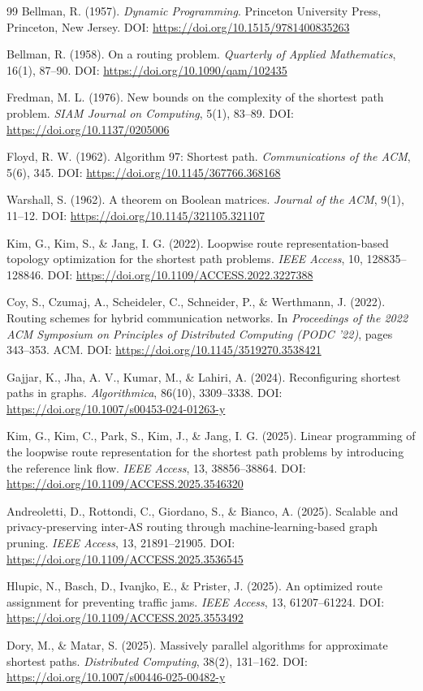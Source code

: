 \documentclass[10pt]{NSP1}
\begin{document}
	\begin{thebibliography}{99}
	Bellman, R. (1957). \emph{Dynamic Programming}. Princeton University Press, Princeton, New Jersey. DOI: \url{https://doi.org/10.1515/9781400835263}
	
	Bellman, R. (1958). On a routing problem. \emph{Quarterly of Applied Mathematics}, 16(1), 87--90. DOI: \url{https://doi.org/10.1090/qam/102435}
	
	Fredman, M. L. (1976). New bounds on the complexity of the shortest path problem. \emph{SIAM Journal on Computing}, 5(1), 83--89. DOI: \url{https://doi.org/10.1137/0205006}
	
	Floyd, R. W. (1962). Algorithm 97: Shortest path. \emph{Communications of the ACM}, 5(6), 345. DOI: \url{https://doi.org/10.1145/367766.368168}
	
	Warshall, S. (1962). A theorem on Boolean matrices. \emph{Journal of the ACM}, 9(1), 11--12. DOI: \url{https://doi.org/10.1145/321105.321107}
	
	Kim, G., Kim, S., \& Jang, I. G. (2022). Loopwise route representation-based topology optimization for the shortest path problems. \emph{IEEE Access}, 10, 128835--128846. DOI: \url{https://doi.org/10.1109/ACCESS.2022.3227388}
	
	Coy, S., Czumaj, A., Scheideler, C., Schneider, P., \& Werthmann, J. (2022). Routing schemes for hybrid communication networks. In \emph{Proceedings of the 2022 ACM Symposium on Principles of Distributed Computing (PODC '22)}, pages 343--353. ACM. DOI: \url{https://doi.org/10.1145/3519270.3538421}
	
	Gajjar, K., Jha, A. V., Kumar, M., \& Lahiri, A. (2024). Reconfiguring shortest paths in graphs. \emph{Algorithmica}, 86(10), 3309--3338. DOI: \url{https://doi.org/10.1007/s00453-024-01263-y}
	
	Kim, G., Kim, C., Park, S., Kim, J., \& Jang, I. G. (2025). Linear programming of the loopwise route representation for the shortest path problems by introducing the reference link flow. \emph{IEEE Access}, 13, 38856--38864. DOI: \url{https://doi.org/10.1109/ACCESS.2025.3546320}
	
	Andreoletti, D., Rottondi, C., Giordano, S., \& Bianco, A. (2025). Scalable and privacy-preserving inter-AS routing through machine-learning-based graph pruning. \emph{IEEE Access}, 13, 21891--21905. DOI: \url{https://doi.org/10.1109/ACCESS.2025.3536545}
	
	Hlupic, N., Basch, D., Ivanjko, E., \& Prister, J. (2025). An optimized route assignment for preventing traffic jams. \emph{IEEE Access}, 13, 61207--61224. DOI: \url{https://doi.org/10.1109/ACCESS.2025.3553492}
	
	Dory, M., \& Matar, S. (2025). Massively parallel algorithms for approximate shortest paths. \emph{Distributed Computing}, 38(2), 131--162. DOI: \url{https://doi.org/10.1007/s00446-025-00482-y}
	\end{thebibliography}
\end{document}
